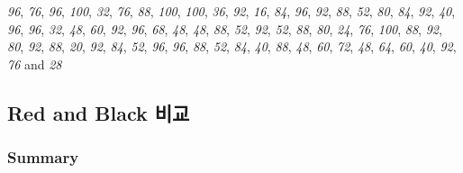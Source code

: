 \documentclass[
]{article}
\begin{document}
\emph{96}, \emph{76}, \emph{96}, \emph{100}, \emph{32}, \emph{76},
\emph{88}, \emph{100}, \emph{100}, \emph{36}, \emph{92}, \emph{16},
\emph{84}, \emph{96}, \emph{92}, \emph{88}, \emph{52}, \emph{80},
\emph{84}, \emph{92}, \emph{40}, \emph{96}, \emph{96}, \emph{32},
\emph{48}, \emph{60}, \emph{92}, \emph{96}, \emph{68}, \emph{48},
\emph{48}, \emph{88}, \emph{52}, \emph{92}, \emph{52}, \emph{88},
\emph{80}, \emph{24}, \emph{76}, \emph{100}, \emph{88}, \emph{92},
\emph{80}, \emph{92}, \emph{88}, \emph{20}, \emph{92}, \emph{84},
\emph{52}, \emph{96}, \emph{96}, \emph{88}, \emph{52}, \emph{84},
\emph{40}, \emph{88}, \emph{48}, \emph{60}, \emph{72}, \emph{48},
\emph{64}, \emph{60}, \emph{40}, \emph{92}, \emph{76} and \emph{28}

\subsection{Red and Black 비교}\label{red-and-black-uxbe44uxad50}

\subsubsection{Summary}\label{summary}
\end{document}
